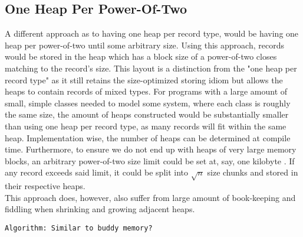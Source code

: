 \subsection{One Heap Per Power-Of-Two}
\label{subsec:one-heap-per-power-of-two}
A different approach as to having one heap per record type, would be having one heap per power-of-two until some arbitrary size. Using this approach, records would be stored in the heap which has a block size of a power-of-two closes matching to the record's size. This layout is a distinction from the "one heap per record type" as it still retains the size-optimized storing idiom but allows the heaps to contain records of mixed types. For programs with a large amount of small, simple classes needed to model some system, where each class is roughly the same size, the amount of heaps constructed would be substantially smaller than using one heap per record type, as many records will fit within the same heap. Implementation wise, the number of heaps can be determined at compile time. Furthermore, to ensure we do not end up with heaps of very large memory blocks, an arbitrary power-of-two size limit could be set at, say, one kilobyte . If any record exceeds said limit, it could be split into $\sqrt{n}$ size chunks and stored in their respective heaps.\\
This approach does, however, also suffer from large amount of book-keeping and fiddling when shrinking and growing adjacent heaps.

\texttt{Algorithm: Similar to buddy memory?}

